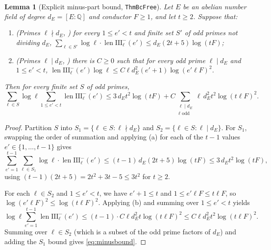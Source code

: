 \documentclass[11pt]{amsart}
\newcommand{\Q}{\mathbb{Q}}
\newcommand{\Sha}{\mathrm{III}}
\DeclareMathOperator{\len}{len}
\theoremstyle{plain}
\newtheorem{lemma}[theorem]{Lemma}
\theoremstyle{definition}
\numberwithin{equation}{section}
\begin{document}
\begin{lemma}[Explicit minus-part bound, \texttt{ThmBcFree}]\label{lem:minuspart}
Let $E$ be an abelian number field of degree $d_E=[E:\Q]$ and conductor $F\ge1$, and let $t\ge2$.
Suppose that:
\begin{enumerate}[label=(\alph*)]
\item \textup{(Primes $\ell\nmid d_E$, )} for every $1\le e'<t$ and finite set
  $S'$ of odd primes not dividing $d_E$,
  $\sum_{\ell\in S'}\log\ell\cdot\len\Sha_\ell^-(e')\le d_E(2t+5)\log(tF)$;
\item \textup{(Primes $\ell\mid d_E$, )} there is $C\ge0$ such that for every odd
  prime $\ell\mid d_E$ and $1\le e'<t$,
  $\len\Sha_\ell^-(e')\log\ell\le C\ell d_E^2(e'+1)\log(e'\ell F)^2$.
\end{enumerate}
Then for every finite set $S$ of odd primes,
\begin{equation}\label{eq:minusbound}
\sum_{\ell\in S}\log\ell\sum_{1\le e'<t}\len\Sha_\ell^-(e')
\le 3\,d_E t^2\log(tF)+C\sum_{\substack{\ell\mid d_E\\\ell\text{ odd}}}\ell\,d_E^2 t^2\log(t\ell F)^2.
\end{equation}
\end{lemma}

\begin{proof}
Partition $S$ into $S_1=\{\ell\in S:\ell\nmid d_E\}$ and $S_2=\{\ell\in S:\ell\mid d_E\}$.
For $S_1$, swapping the order of summation and applying (a) for each of the $t-1$ values
$e'\in\{1,\dots,t-1\}$ gives
\[
\sum_{e'=1}^{t-1}\sum_{\ell\in S_1}\log\ell\cdot\len\Sha_\ell^-(e')
\le (t-1)\,d_E(2t+5)\log(tF)\le 3\,d_E t^2\log(tF),
\]
using $(t-1)(2t+5)=2t^2+3t-5\le 3t^2$ for $t\ge2$.

For each $\ell\in S_2$ and $1\le e'<t$, we have $e'+1\le t$ and $1\le e'\ell F\le t\ell F$, so
$\log(e'\ell F)^2\le\log(t\ell F)^2$. Applying (b) and summing over $1\le e'<t$ yields
\[
\log\ell\sum_{e'=1}^{t-1}\len\Sha_\ell^-(e')
\le (t-1)\cdot C\ell d_E^2 t\log(t\ell F)^2\le C\ell d_E^2 t^2\log(t\ell F)^2.
\]
Summing over $\ell\in S_2$ (which is a subset of the odd prime factors of $d_E$) and adding the
$S_1$ bound gives \eqref{eq:minusbound}.
\end{proof}
\end{document}

